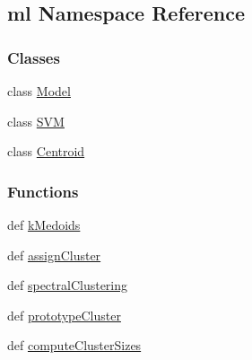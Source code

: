 \hypertarget{namespaceml}{\subsection{ml Namespace Reference}
\label{namespaceml}
}
\subsubsection*{Classes}
\begin{DoxyCompactItemize}
\item 
class \hyperlink{classml_1_1Model}{Model}
\item 
class \hyperlink{classml_1_1SVM}{S\-V\-M}
\item 
class \hyperlink{classml_1_1Centroid}{Centroid}
\end{DoxyCompactItemize}
\subsubsection*{Functions}
\begin{DoxyCompactItemize}
\item 
def \hyperlink{namespaceml_af93a28eff9783156aa4ce06db244772e}{k\-Medoids}
\item 
def \hyperlink{namespaceml_afbad2de6aa3fc1a55b6c6ba760ac096f}{assign\-Cluster}
\item 
def \hyperlink{namespaceml_aeb989e0ad041c1ab2b9214558cbdbd47}{spectral\-Clustering}
\item 
def \hyperlink{namespaceml_af2298af4670beb42bbc1913e88c265f9}{prototype\-Cluster}
\item 
def \hyperlink{namespaceml_a018c2265de63dd0e4becbc083874f104}{compute\-Cluster\-Sizes}
\end{DoxyCompactItemize}


